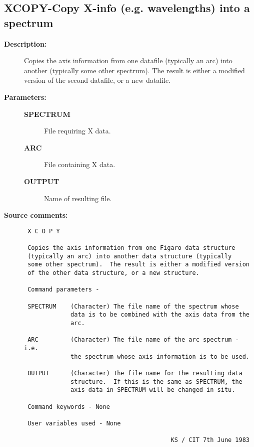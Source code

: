 \subsection{XCOPY-\label{XCOPY}Copy X-info (e.g. wavelengths) into a spectrum}
\begin{description}

\item [{\bf Description:}]
 Copies the axis information from one datafile (typically an
 arc) into another (typically some other spectrum).  The
 result is either a modified version of the second datafile,
 or a new datafile.

\item [{\bf Parameters:}]
\begin{description}
\item [{\bf SPECTRUM}]
 File requiring X data.
\item [{\bf ARC}]
 File containing X data.
\item [{\bf OUTPUT}]
 Name of resulting file.
\end{description}

\item [{\bf Source comments:}]
\begin{verbatim}
 X C O P Y

 Copies the axis information from one Figaro data structure
 (typically an arc) into another data structure (typically
 some other spectrum).  The result is either a modified version
 of the other data structure, or a new structure.

 Command parameters -

 SPECTRUM    (Character) The file name of the spectrum whose
             data is to be combined with the axis data from the
             arc.

 ARC         (Character) The file name of the arc spectrum - i.e.
             the spectrum whose axis information is to be used.

 OUTPUT      (Character) The file name for the resulting data
             structure.  If this is the same as SPECTRUM, the
             axis data in SPECTRUM will be changed in situ.

 Command keywords - None

 User variables used - None

                                         KS / CIT 7th June 1983
\end{verbatim}
\end{description}

